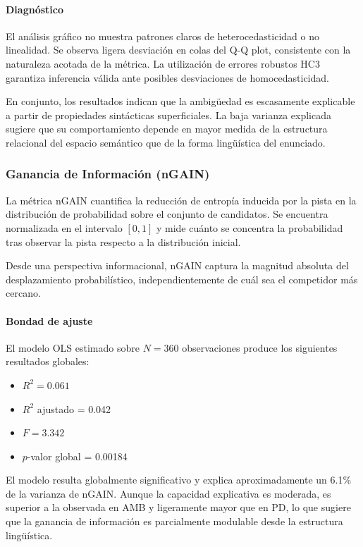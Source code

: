 \paragraph{Diagnóstico}

El análisis gráfico no muestra patrones claros de heterocedasticidad o no linealidad. Se observa ligera desviación en colas del Q-Q plot, consistente con la naturaleza acotada de la métrica. La utilización de errores robustos HC3 garantiza inferencia válida ante posibles desviaciones de homocedasticidad.

En conjunto, los resultados indican que la ambigüedad es escasamente explicable a partir de propiedades sintácticas superficiales. La baja varianza explicada sugiere que su comportamiento depende en mayor medida de la estructura relacional del espacio semántico que de la forma lingüística del enunciado.

\subsubsection{Ganancia de Información (nGAIN)}

La métrica nGAIN cuantifica la reducción de entropía inducida por la pista en la distribución de probabilidad sobre el conjunto de candidatos. Se encuentra normalizada en el intervalo $[0,1]$ y mide cuánto se concentra la probabilidad tras observar la pista respecto a la distribución inicial.

Desde una perspectiva informacional, nGAIN captura la magnitud absoluta del desplazamiento probabilístico, independientemente de cuál sea el competidor más cercano.

\paragraph{Bondad de ajuste}

El modelo OLS estimado sobre $N = 360$ observaciones produce los siguientes resultados globales:

\begin{itemize}
\item $R^2 = 0.061$
\item $R^2$ ajustado = 0.042
\item $F = 3.342$
\item $p$-valor global = 0.00184
\end{itemize}

El modelo resulta globalmente significativo y explica aproximadamente un 6.1\% de la varianza de nGAIN. Aunque la capacidad explicativa es moderada, es superior a la observada en AMB y ligeramente mayor que en PD, lo que sugiere que la ganancia de información es parcialmente modulable desde la estructura lingüística.

